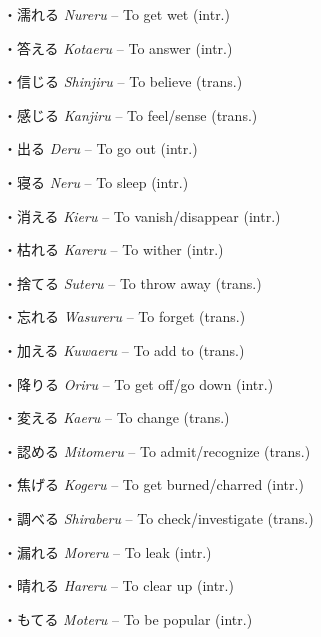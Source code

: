 \par{・濡れる \emph{Nureru }– To get wet (intr.) }

\par{・答える \emph{Kotaeru }– To answer (intr.) }

\par{・信じる \emph{Shinjiru }– To believe (trans.) }

\par{・感じる \emph{Kanjiru }– To feel\slash sense (trans.) }

\par{・出る \emph{Deru }– To go out (intr.) }

\par{・寝る \emph{Neru }– To sleep (intr.) }

\par{・消える \emph{Kieru }– To vanish\slash disappear (intr.) }

\par{・枯れる \emph{Kareru }– To wither (intr.) }

\par{・捨てる \emph{Suteru }– To throw away (trans.) }

\par{・忘れる \emph{Wasureru }– To forget (trans.) }

\par{・加える \emph{Kuwaeru }– To add to (trans.) }

\par{・降りる \emph{Oriru }– To get off\slash go down (intr.) }

\par{・変える \emph{Kaeru }– To change (trans.) }

\par{・認める \emph{Mitomeru }– To admit\slash recognize (trans.) }

\par{・焦げる \emph{Kogeru }– To get burned\slash charred (intr.) }

\par{・調べる \emph{Shiraberu }– To check\slash investigate (trans.) }

\par{・漏れる \emph{Moreru }– To leak (intr.) }

\par{・晴れる \emph{Hareru }– To clear up (intr.) }

\par{・もてる \emph{Moteru }– To be popular (intr.) }
      
